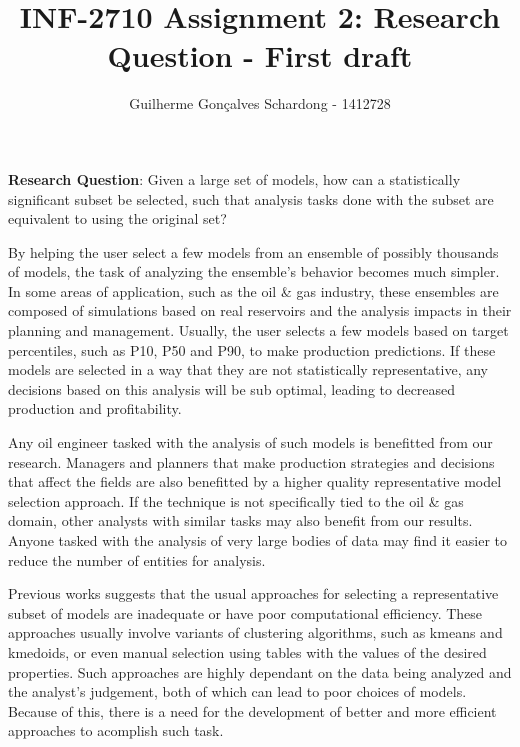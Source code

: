 \documentclass[]{article}
\title{INF-2710 Assignment 2: Research Question - First draft}
\author{Guilherme Gon\c{c}alves Schardong - 1412728}
\begin{document}
\maketitle

\textbf{Research Question}: Given a large set of models, how can a statistically significant subset be selected, such that analysis tasks done with the subset are equivalent to using the original set?

By helping the user select a few models from an ensemble of possibly thousands of models, the task of analyzing the ensemble's behavior becomes much simpler. In some areas of application, such as the oil \& gas industry, these ensembles are composed of simulations based on real reservoirs and the analysis impacts in their planning and management. Usually, the user selects a few models based on target percentiles, such as P10, P50 and P90, to make production predictions. If these models are selected in a way that they are not statistically representative, any decisions based on this analysis will be sub optimal, leading to decreased production and profitability.

Any oil engineer tasked with the analysis of such models is benefitted from our research. Managers and planners that make production strategies and decisions that affect the fields are also benefitted by a higher quality representative model selection approach. If the technique is not specifically tied to the oil \& gas domain, other analysts with similar tasks may also benefit from our results. Anyone tasked with the analysis of very large bodies of data may find it easier to reduce the number of entities for analysis.

Previous works suggests that the usual approaches for selecting a representative subset of models are inadequate or have poor computational efficiency. These approaches usually involve variants of clustering algorithms, such as kmeans and kmedoids, or even manual selection using tables with the values of the desired properties. Such approaches are highly dependant on the data being analyzed and the analyst's judgement, both of which can lead to poor choices of models. Because of this, there is a need for the development of better and more efficient approaches to acomplish such task.
\end{document}
